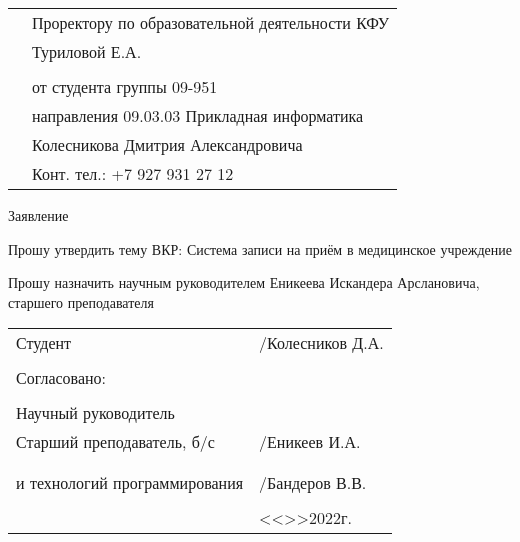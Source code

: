 \documentclass[a4paper]{article}
\begin{document}
    \begin{titlepage}
        \begin{xltabular}{\textwidth} {
                >{\hsize} X
                >{\hsize} X }
            & Проректору по образовательной деятельности КФУ \\
            & Туриловой Е.А. \\
            & \\
            & от студента группы 09-951 \\
            & направления 09.03.03 Прикладная информатика \\
            & Колесникова Дмитрия Александровича \\
            & Конт. тел.: +7 927 931 27 12 \\
        \end{xltabular}

        \begin{center}
            Заявление
        \end{center}

        \begin{flushleft}
            Прошу утвердить тему ВКР: Система записи на приём в медицинское учреждение \\
        \end{flushleft}

        \begin{flushleft}
            Прошу назначить научным руководителем Еникеева Искандера Арслановича, старшего преподавателя
        \end{flushleft}

        \vfill

        \begin{xltabular}{\textwidth} {
                >{\hsize} X
                >{\hsize} X }
            Студент & \underline{\hspace{3cm}}/Колесников Д.А. \\
            & \\
            Согласовано: & \\
            & \\
            Научный руководитель & \\
            Старший преподаватель, б/с & \underline{\hspace{3cm}}/Еникеев И.А. \\
            & \\
             \\
            и технологий программирования & \underline{\hspace{3cm}}/Бандеров В.В. \\
            & \\
            & <<\underline{\hspace{1cm}}>>\underline{\hspace{3cm}}2022г. \\
        \end{xltabular}
    \end{titlepage}
\end{document}
